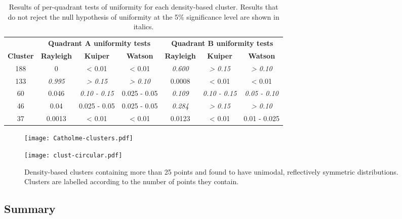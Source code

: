 \documentclass[../../ArchStats.tex]{subfiles}
\begin{document}
\begin{table}[!ht]
\footnotesize
\caption{Results of per-quadrant tests of uniformity for each density-based cluster. Results that do not reject the null hypothesis of uniformity at the 5\% significance level are shown in italics.}
\label{tab:Cat-quads}
\begin{tabular}{c|ccc|ccc}
                 & \multicolumn{3}{c|}{\textbf{Quadrant A uniformity tests}} & \multicolumn{3}{c}{\textbf{Quadrant B uniformity tests}}\\
\textbf{Cluster} & \textbf{Rayleigh} & \textbf{Kuiper} & \textbf{Watson} & \textbf{Rayleigh} & \textbf{Kuiper} & \textbf{Watson} \\
\hline
188 & 0     & < 0.01 & < 0.01 & \textit{0.600} & \textit{> 0.15} & \textit{> 0.10} \\
133 & \textit{0.995} & \textit{> 0.15} & \textit{> 0.10} & 0.0008& < 0.01 & < 0.01 \\
60  & 0.046 &\textit{ 0.10 - 0.15} & 0.025 - 0.05 &\textit{ 0.109 }&\textit{ 0.10 - 0.15}&\textit{ 0.05 - 0.10}\\
46  & 0.04 &  0.025 - 0.05  &  0.025 - 0.05  &\textit{ 0.284} &\textit{> 0.15} &\textit{> 0.10}\\
37  &0.0013 & < 0.01   &< 0.01  &  0.0123  &   < 0.01   & 0.01 - 0.025  \\
\end{tabular}
\end{table}


\begin{figure}[!ht]
\caption{Density-based clusters containing more than 25 points and found to have unimodal, reflectively symmetric distributions. Clusters are labelled according to the number of points they contain.} 
\begin{minipage}[t]{0.47\textwidth}
	\centering
	\label{fig:Cat-clusters}
 	\texttt{[image: Catholme-clusters.pdf]}
 \end{minipage}
 \hfill
	\begin{minipage}[t]{0.47\textwidth}
  		\centering
		\label{fig:clust-circ}
		\texttt{[image: clust-circular.pdf]}
    \end{minipage}
 \end{figure}
 
\subsection{Summary}
\end{document}
